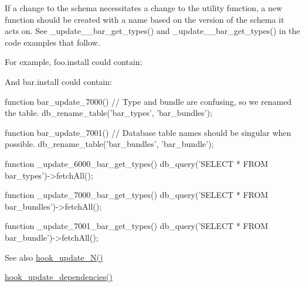If a change to the schema necessitates a change to the utility function, a new function should be created with a name based on the version of the schema it acts on. See \_\-update\_\_\-bar\_\-get\_\-types() and \_\-update\_\_\-bar\_\-get\_\-types() in the code examples that follow.

For example, foo.install could contain: 


And bar.install could contain: 
\begin{DoxyCode}
 function bar_update_7000() {
   // Type and bundle are confusing, so we renamed the table.
   db_rename_table('bar_types', 'bar_bundles');
 }

 function bar_update_7001() {
   // Database table names should be singular when possible.
   db_rename_table('bar_bundles', 'bar_bundle');
 }

 function _update_6000_bar_get_types() {
   db_query('SELECT * FROM {bar_types}')->fetchAll();
 }

 function _update_7000_bar_get_types() {
   db_query('SELECT * FROM {bar_bundles'})->fetchAll();
 }

 function _update_7001_bar_get_types() {
   db_query('SELECT * FROM {bar_bundle}')->fetchAll();
 }
\end{DoxyCode}


\begin{DoxySeeAlso}{See also}
\hyperlink{group__hooks_ga908950689e6b85cd0fae3b780d69a41f}{hook\_\-update\_\-N()} 

\hyperlink{group__hooks_ga23e9e019b7ec64d95bafbeaffd295483}{hook\_\-update\_\-dependencies()} 
\end{DoxySeeAlso}
